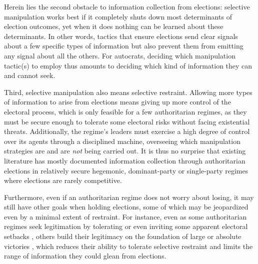 \documentclass[12pt]{article}
\newcommand{\1}{\mathbbm{1}}
\begin{document}
Herein lies the second obstacle to information collection from elections: selective manipulation works best if it completely shuts down most determinants of election outcomes, yet when it does nothing can be learned about these determinants. In other words, tactics that ensure elections send clear signals about a few specific types of information but also prevent them from emitting any signal about all the others. For autocrats, deciding which manipulation tactic(s) to employ thus amounts to deciding which kind of information they can and cannot seek.

Third, selective manipulation also means selective restraint. Allowing more types of information to arise from elections means giving up more control of the electoral process, which is only feasible for a few authoritarian regimes, as they must be secure enough to tolerate some electoral risks without facing existential threats. Additionally, the regime's leaders must exercise a high degree of control over its agents through a disciplined machine, overseeing which manipulation strategies are and are \textit{not} being carried out. It is thus no surprise that existing literature has mostly documented information collection through authoritarian elections in relatively secure hegemonic, dominant-party or single-party regimes where elections are rarely competitive.

Furthermore, even if an authoritarian regime does not worry about losing, it may still have other goals when holding elections, some of which may be jeopardized even by a minimal extent of restraint. For instance, even as some authoritarian regimes seek legitimation by tolerating or even inviting some apparent electoral setbacks \parencite{Morgenbesser2016}, others build their legitimacy on the foundation of large or absolute victories \parencite{Simpser2013}, which reduces their ability to tolerate selective restraint and limits the range of information they could glean from elections.
\end{document}
